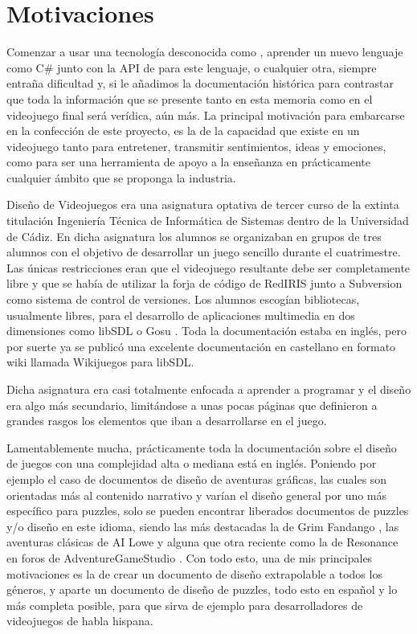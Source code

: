 \section{Motivaciones}
\label{sec:motivaciones}
Comenzar a usar una tecnología desconocida como , aprender un nuevo lenguaje como C\# junto con la API de  para este lenguaje, o cualquier otra, siempre entraña dificultad y, si le añadimos la documentación histórica para contrastar que toda la información que se presente tanto en esta memoria como en el videojuego final será verídica, aún más. La principal motivación para embarcarse en la confección de este proyecto, es la de la capacidad que existe en un videojuego tanto para entretener, transmitir sentimientos, ideas y emociones, como para ser una herramienta de apoyo a la enseñanza en prácticamente cualquier ámbito que se proponga la industria.

Diseño de Videojuegos era una asignatura optativa de tercer curso de la extinta titulación Ingeniería Técnica de Informática de Sistemas dentro de la Universidad de Cádiz. En dicha asignatura los alumnos se organizaban en grupos de tres alumnos con el objetivo de desarrollar un juego sencillo durante el cuatrimestre. Las únicas restricciones eran que el videojuego resultante debe ser completamente libre y que se había de utilizar la forja de código de RedIRIS  junto a Subversion  como sistema de control de versiones. Los alumnos escogían bibliotecas, usualmente libres, para el desarrollo de aplicaciones multimedia en dos dimensiones como libSDL  o Gosu . Toda la documentación estaba en inglés, pero por suerte ya se publicó una excelente documentación en castellano en formato wiki llamada Wikijuegos  para libSDL.

Dicha asignatura era casi totalmente enfocada a aprender a programar y el diseño era algo más secundario, limitándose a unas pocas páginas que definieron a grandes rasgos los elementos que iban a desarrollarse en el juego.

Lamentablemente mucha, prácticamente toda la documentación sobre el diseño de juegos con una complejidad alta o mediana está en inglés. Poniendo por ejemplo el caso de documentos de diseño de aventuras gráficas, las cuales son orientadas más al contenido narrativo y varían el diseño general por uno más específico para puzzles, solo se pueden encontrar liberados documentos de puzzles y/o diseño en este idioma, siendo las más destacadas la de Grim Fandango , las aventuras clásicas de AI Lowe  y alguna que otra reciente como la de Resonance en foros de AdventureGameStudio . Con todo esto, una de mis principales motivaciones es la de crear un documento de diseño extrapolable a todos los géneros, y aparte un documento de diseño de puzzles, todo esto en español y lo más completa posible, para que sirva de ejemplo para desarrolladores de videojuegos de habla hispana.


